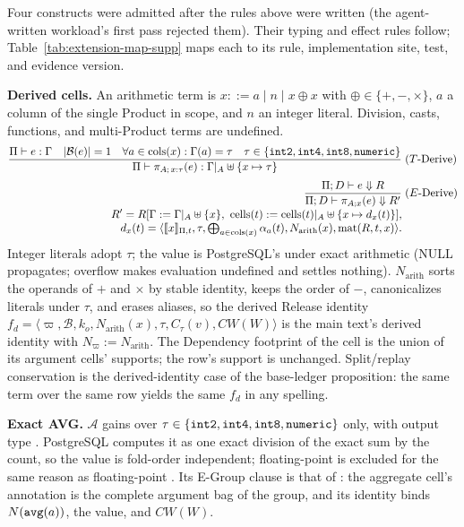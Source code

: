 \documentclass[journal,onecolumn]{IEEEtran}
\newcommand{\code}[1]{\texttt{\detokenize{#1}}}
\newcommand{\llbracket}{[\![}
\newcommand{\rrbracket}{]\!]}
\begin{document}
Four constructs were admitted after the rules above were written (the
agent-written workload's first pass rejected them). Their typing and effect
rules follow; Table~\ref{tab:extension-map-supp} maps each to its rule,
implementation site, test, and evidence version.

\textbf{Derived cells.} An arithmetic term is
$x ::= a \mid n \mid x\oplus x$ with $\oplus\in\{+,-,\times\}$, $a$ a column of
the single Product in scope, and $n$ an integer literal. Division, casts,
functions, and multi-Product terms are undefined.
\begingroup\small
\begin{align*}
\frac{\Pi\vdash e:\Gamma\quad |\mathcal B(e)|=1\quad
      \forall a\in\operatorname{cols}(x):\Gamma(a)=\tau\quad
      \tau\in\{\code{int2},\code{int4},\code{int8},\code{numeric}\}}
 {\Pi\vdash \pi_{A;\,x{:}\tau}(e):\Gamma|_A\uplus\{x\mapsto\tau\}}
&\;(T\text{-Derive})\\[1mm]
\frac{\Pi;D\vdash e\Downarrow R}
 {\Pi;D\vdash\pi_{A;x}(e)\Downarrow R'}
&\;(E\text{-Derive})\\[-1mm]
R'=R[\Gamma:=\Gamma|_A\uplus\{x\},\ \operatorname{cells}(t):=\operatorname{cells}(t)|_A\uplus\{x\mapsto d_x(t)\}],&\\[-1mm]
d_x(t)=\langle\llbracket x\rrbracket_{\Pi,t},\tau,
  \textstyle\bigoplus_{a\in\operatorname{cols}(x)}\alpha_a(t),N_{\mathrm{arith}}(x),\operatorname{mat}(R,t,x)\rangle .&
\end{align*}
\endgroup
Integer literals adopt $\tau$; the value is PostgreSQL's under exact
arithmetic (NULL propagates; overflow makes evaluation undefined and
settles nothing). $N_{\mathrm{arith}}$ sorts the operands of $+$ and
$\times$ by stable identity, keeps the order of $-$, canonicalizes literals
under $\tau$, and erases aliases, so the derived Release identity
$f_d=\langle\varpi,\mathcal B,k_o,N_{\mathrm{arith}}(x),\tau,C_\tau(v),CW(W)\rangle$
is the main text's derived identity with $N_\varpi:=N_{\mathrm{arith}}$. The
Dependency footprint of the cell is the union of its argument cells'
supports; the row's support is unchanged. Split/replay conservation is
the derived-identity case of the base-ledger proposition: the same term over
the same row yields the same $f_d$ in any spelling.

\textbf{Exact AVG.} $\mathcal A$ gains \code{AVG} over
$\tau\in\{\code{int2},\code{int4},\code{int8},\code{numeric}\}$ only, with
output type \code{numeric}. PostgreSQL computes it as one exact
\code{numeric} division of the exact sum by the count, so the value is
fold-order independent; floating-point \code{AVG} is excluded for the same
reason as floating-point \code{SUM}. Its E-Group clause is that of
\code{SUM}: the aggregate cell's annotation is the complete argument bag of
the group, and its identity binds $N(\code{avg}(a))$, the value, and $CW(W)$.
\end{document}
